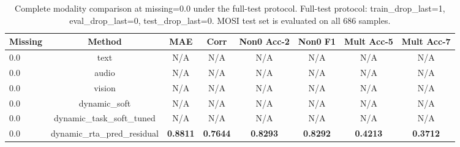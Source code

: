 \begin{table}[t]
\centering
\small
\begin{tabular}{lccccccc}
\toprule
Missing & Method & MAE & Corr & Non0 Acc-2 & Non0 F1 & Mult Acc-5 & Mult Acc-7 \\
\midrule
0.0 & text & N/A & N/A & N/A & N/A & N/A & N/A \\
0.0 & audio & N/A & N/A & N/A & N/A & N/A & N/A \\
0.0 & vision & N/A & N/A & N/A & N/A & N/A & N/A \\
0.0 & dynamic\_soft & N/A & N/A & N/A & N/A & N/A & N/A \\
0.0 & dynamic\_task\_soft\_tuned & N/A & N/A & N/A & N/A & N/A & N/A \\
0.0 & dynamic\_rta\_pred\_residual & \textbf{0.8811} & \textbf{0.7644} & \textbf{0.8293} & \textbf{0.8292} & \textbf{0.4213} & \textbf{0.3712} \\
\bottomrule
\end{tabular}
\caption{Complete modality comparison at missing=0.0 under the full-test protocol. Full-test protocol: train\_drop\_last=1, eval\_drop\_last=0, test\_drop\_last=0. MOSI test set is evaluated on all 686 samples.}
\label{tab:complete_modality_mosi_fulltest}
\end{table}